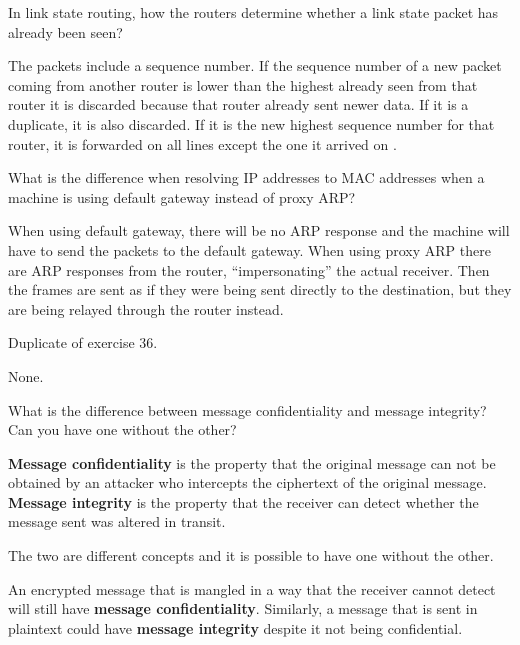 \begin{Exercise}
In link state routing, how the routers determine whether a link state packet has already been seen?
\end{Exercise}
\begin{Answer}
The packets include a sequence number. If the sequence number of a new packet coming from another router is lower than the highest already seen from that router it is discarded because that router already sent newer data. If it is a duplicate, it is also discarded. If it is the new highest sequence number for that router, it is forwarded on all lines except the one it arrived on \cite[p.~376]{computer-networks-tanenbaum-2012}.
\end{Answer}

\begin{Exercise}
What is the difference when resolving IP addresses to MAC addresses when a machine is using default gateway instead of proxy ARP?
\end{Exercise}
\begin{Answer}
When using default gateway, there will be no ARP response and the machine will have to send the packets to the default gateway.
When using proxy ARP there are ARP responses from the router, ``impersonating'' the actual receiver.
Then the frames are sent as if they were being sent directly to the destination, but they are being relayed through the router instead.
\end{Answer}

\begin{Exercise}
Duplicate of exercise 36.
\end{Exercise}
\begin{Answer}
None.
\end{Answer}

\begin{Exercise}
What is the difference between message confidentiality and message integrity? Can you have one without the other?
\end{Exercise}
\begin{Answer}
\textbf{Message confidentiality} is the property that the original message can not be obtained by an attacker who intercepts the ciphertext of the original message.
\textbf{Message integrity} is the property that the receiver can detect whether the message sent was altered in transit.

The two are different concepts and it is possible to have one without the other.

An encrypted message that is mangled in a way that the receiver cannot detect will still have \textbf{message confidentiality}.
Similarly, a message that is sent in plaintext could have \textbf{message integrity} despite it not being confidential.
\end{Answer}

